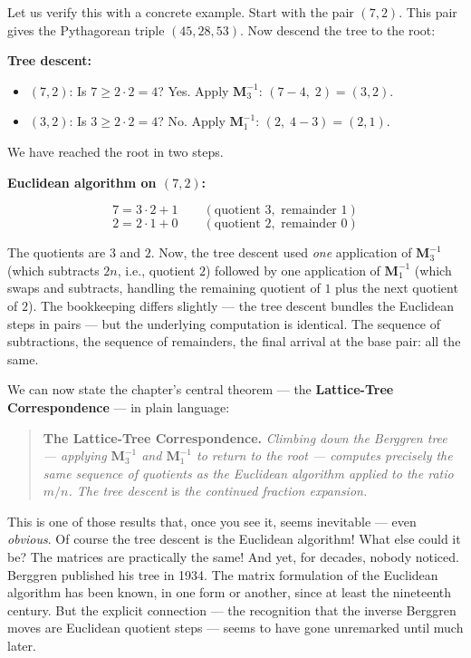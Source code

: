 \documentclass[11pt,twoside,openright]{book}
\theoremstyle{definition}
\theoremstyle{remark}
\begin{document}
Let us verify this with a concrete example. Start with the pair $(7, 2)$. This pair gives the Pythagorean triple $(45, 28, 53)$. Now descend the tree to the root:

\textbf{Tree descent:}

\begin{itemize}
  \item $(7, 2)$: Is $7 \ge 2 \cdot 2 = 4$? Yes. Apply $\mathbf{M}_3^{-1}$: $(7 - 4,\; 2) = (3, 2)$.
  \item $(3, 2)$: Is $3 \ge 2 \cdot 2 = 4$? No. Apply $\mathbf{M}_1^{-1}$: $(2,\; 4 - 3) = (2, 1)$.
\end{itemize}

We have reached the root in two steps.

\textbf{Euclidean algorithm on $(7, 2)$:}

\[7 = 3 \cdot 2 + 1 \qquad (\text{quotient } 3, \text{ remainder } 1)\]
\[2 = 2 \cdot 1 + 0 \qquad (\text{quotient } 2, \text{ remainder } 0)\]

The quotients are $3$ and $2$. Now, the tree descent used \textit{one} application of $\mathbf{M}_3^{-1}$ (which subtracts $2n$, i.e., quotient $2$) followed by one application of $\mathbf{M}_1^{-1}$ (which swaps and subtracts, handling the remaining quotient of $1$ plus the next quotient of $2$). The bookkeeping differs slightly --- the tree descent bundles the Euclidean steps in pairs --- but the underlying computation is identical. The sequence of subtractions, the sequence of remainders, the final arrival at the base pair: all the same.


We can now state the chapter's central theorem --- the \textbf{Lattice-Tree Correspondence} --- in plain language:

\begin{quote}
\textbf{The Lattice-Tree Correspondence.} \textit{Climbing down the Berggren tree --- applying $\mathbf{M}_3^{-1}$ and $\mathbf{M}_1^{-1}$ to return to the root --- computes precisely the same sequence of quotients as the Euclidean algorithm applied to the ratio $m/n$. The tree descent} is \textit{the continued fraction expansion.}
\end{quote}
This is one of those results that, once you see it, seems inevitable --- even \textit{obvious}. Of course the tree descent is the Euclidean algorithm! What else could it be? The matrices are practically the same! And yet, for decades, nobody noticed. Berggren published his tree in 1934. The matrix formulation of the Euclidean algorithm has been known, in one form or another, since at least the nineteenth century. But the explicit connection --- the recognition that the inverse Berggren moves are Euclidean quotient steps --- seems to have gone unremarked until much later.
\end{document}
